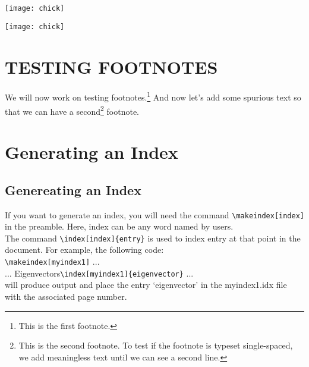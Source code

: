 \documentclass[12pt,Bold,letterpaper,TexShade]{mcgilletdclass}
\begin{document}
\newpage

\begin{center}
  \texttt{[image: chick]}
\end{center}
\begin{figure}[ht]
  \begin{center}
  \end{center}
\end{figure}

\begin{center}
  \texttt{[image: chick]}
\end{center}

\begin{figure}[ht]
  \begin{center}
  \end{center}
\end{figure}


\chapter{TESTING FOOTNOTES}
We will now work on testing footnotes.\footnote{This is the first footnote.}
And now let's add some spurious text so that we can have a second\footnote{This
is the second footnote. To test if the footnote is typeset single-spaced, 
we add meaningless text until we can see a second line.} footnote.

\chapter{Generating an Index}
\section{Genereating an Index}
If you want to generate an index, you will need the command \verb=\makeindex[index]= in the 
preamble. Here, index can be any word named by users.\\

The command \verb=\index[index]{entry}= is used to index entry at that point in the document. 
For example, the following code:\\
	\verb=\makeindex[myindex1]= ...\\%
	... Eigenvectors\verb=\index[myindex1]{eigenvector}= ...\\%
will produce output and place the entry `eigenvector' in the myindex1.idx file with the associated page number.\\%
\end{document}
